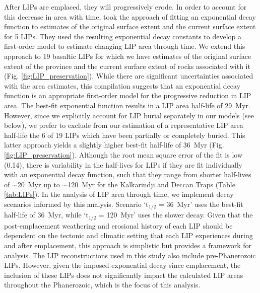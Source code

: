 \documentclass[11pt,letterpaper]{article}
\begin{document}
After LIPs are emplaced, they will progressively erode. In order to account for this decrease in area with time, \citet{Godderis2017a} took the approach of fitting an exponential decay function to estimates of the original surface extent and the current surface extent for 5 LIPs. They used the resulting exponential decay constants to develop a first-order model to estimate changing LIP area through time. We extend this approach to 19 basaltic LIPs for which we have estimates of the original surface extent of the province and the current surface extent of rocks associated with it (Fig. \ref{fig:LIP_preservation}). While there are significant uncertainties associated with the area estimates, this compilation suggests that an exponential decay function is an appropriate first-order model for the progressive reduction in LIP area. The best-fit exponential function results in a LIP area half-life of 29~Myr. However, since we explicitly account for LIP burial separately in our models (see below), we prefer to exclude from our estimation of a representative LIP area half-life the 6 of 19 LIPs which have been partially or completely buried. This latter approach yields a slightly higher best-fit half-life of 36~Myr (Fig. \ref{fig:LIP_preservation}). Although the root mean square error of the fit is low (0.14), there is variability in the half-lives for LIPs if they are fit individually with an exponential decay function, such that they range from shorter half-lives of $\sim$20~Myr up to $\sim$120~Myr for the Kalkarindji and Deccan Traps (Table \ref{tab:LIPs}). In the analysis of LIP area through time, we implement decay scenarios informed by this analysis. Scenario `t$_{1/2}$ = 36~Myr' uses the best-fit half-life of 36~Myr, while `t$_{1/2}$ = 120~Myr' uses the slower decay. Given that the post-emplacement weathering and erosional history of each LIP should be dependent on the tectonic and climatic setting that each LIP experiences during and after emplacement, this approach is simplistic but provides a framework for analysis. The LIP reconstructions used in this study also include pre-Phanerozoic LIPs. However, given the imposed exponential decay since emplacement, the inclusion of these LIPs does not significantly impact the calculated LIP areas throughout the Phanerozoic, which is the focus of this analysis.
\end{document}
